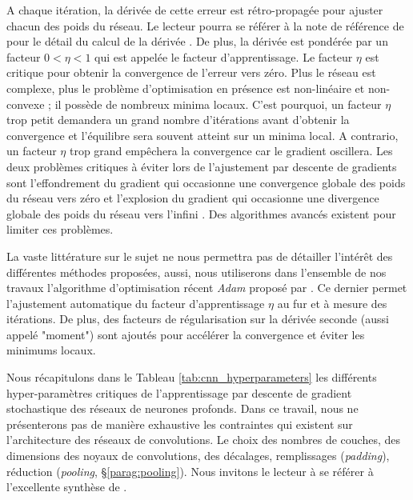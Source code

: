 A chaque itération, la dérivée de cette erreur est rétro-propagée pour ajuster chacun des poids du réseau.
Le lecteur pourra se référer à la note de référence de \citeauthor{sadowski_notes_2016} pour le détail du calcul de la dérivée \cite{sadowski_notes_2016}.
De plus, la dérivée est pondérée par un facteur $0 < \eta < 1$ qui est appelée le facteur d'apprentissage.
Le facteur $\eta$ est critique pour obtenir la convergence de l'erreur vers zéro.
Plus le réseau est complexe, plus le problème d'optimisation en présence est non-linéaire et non-convexe ; il possède de nombreux minima locaux.
C'est pourquoi, un facteur $\eta$ trop petit demandera un grand nombre d'itérations avant d'obtenir la convergence et l'équilibre sera souvent atteint sur un minima local.
A contrario, un facteur $\eta$ trop grand empêchera la convergence car le gradient oscillera.
Les deux problèmes critiques à éviter lors de l'ajustement par descente de gradients sont l'effondrement du gradient qui occasionne une convergence globale des poids du réseau vers zéro et l'explosion du gradient qui occasionne une divergence globale des poids du réseau vers l'infini \cite{bengio_learning_1994, hochreiter_gradient_2001}.
Des algorithmes avancés existent pour limiter ces problèmes.

La vaste littérature sur le sujet ne nous permettra pas de détailler l'intérêt des différentes méthodes proposées, aussi, nous utiliserons dans l'ensemble de nos travaux l'algorithme d'optimisation récent \textit{Adam} proposé par \citeauthor{kingma_adam_2014} \cite{kingma_adam_2014}.
Ce dernier permet l'ajustement automatique du facteur d'apprentissage  $\eta$ au fur et à mesure des itérations.
De plus, des facteurs de régularisation sur la dérivée seconde (aussi appelé "moment") sont ajoutés pour accélérer la convergence et éviter les minimums locaux.

Nous récapitulons dans le Tableau \ref{tab:cnn_hyperparameters} les différents hyper-paramètres critiques de l'apprentissage par descente de gradient stochastique des réseaux de neurones profonds. Dans ce travail, nous ne présenterons pas de manière exhaustive les contraintes qui existent sur l'architecture des réseaux de convolutions. Le choix des nombres de couches, des dimensions des noyaux de convolutions, des décalages, remplissages (\textit{padding}), réduction (\textit{pooling}, §\ref{parag:pooling}). Nous invitons le lecteur à se référer à l'excellente synthèse de \citeauthor{dumoulin_guide_2016} \cite{dumoulin_guide_2016}.

